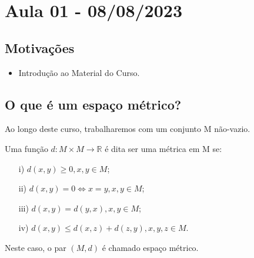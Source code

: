 \documentclass[MetricSpaces/metric_notes.tex]{subfiles}
\begin{document}
\section{Aula 01 - 08/08/2023}
\subsection{Motivações}
\begin{itemize}
	\item Introdução ao Material do Curso.
\end{itemize}
\subsection*{O que é um espaço métrico?}
Ao longo deste curso, trabalharemos com um conjunto M não-vazio.
\hypertarget{def_metric}{ \begin{def*}
		Uma função \(d:M\times M\rightarrow \mathbb{R}\) é dita ser uma métrica em M se:
		\begin{itemize}
			\item[i)] \(d(x, y)\geq 0, x, y\in M\);
			\item[ii)] \(d(x, y) = 0 \Leftrightarrow x = y, x, y\in M\);
			\item[iii)] \(d(x, y) = d(y, x), x, y\in M\);
			\item[iv)] \(d(x, y)\leq d(x, z) + d(z, y), x, y, z\in M\).
		\end{itemize}
		Neste caso, o par \((M, d)\) é chamado espaço métrico.
	\end{def*}
}
\end{document}
